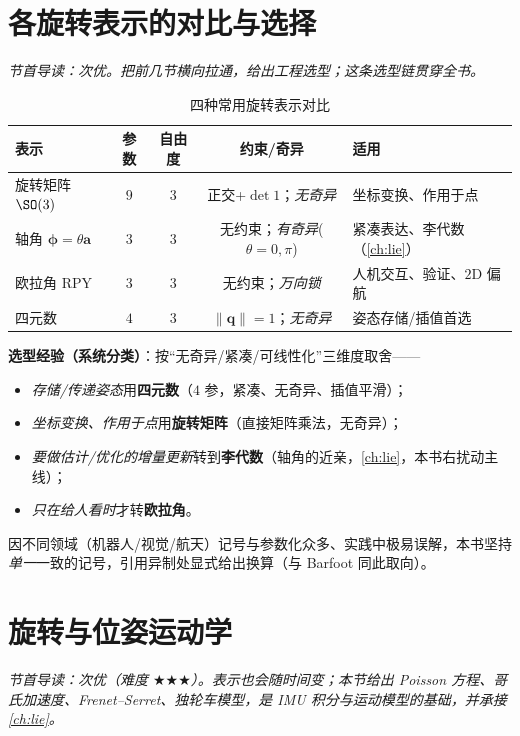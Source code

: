 \section{各旋转表示的对比与选择}
\label{sec:rb-compare}
\noindent\emph{节首导读：次优。把前几节横向拉通，给出工程选型；这条选型链贯穿全书。}

\begin{table}[H]\centering\small
\caption{四种常用旋转表示对比}
\label{tab:rb-compare}
\begin{tabular}{lcccl}
\toprule
表示 & 参数 & 自由度 & 约束/奇异 & 适用 \\
\midrule
旋转矩阵 $\SO(3)$ & $9$ & $3$ & 正交+$\det1$；\emph{无奇异} & 坐标变换、作用于点 \\
轴角 $\boldsymbol{\phi}=\theta\mathbf{a}$ & $3$ & $3$ & 无约束；\emph{有奇异}($\theta=0,\pi$) & 紧凑表达、李代数（\cref{ch:lie}）\\
欧拉角 RPY & $3$ & $3$ & 无约束；\emph{万向锁} & 人机交互、验证、$2$D 偏航 \\
四元数 & $4$ & $3$ & $\|\mathbf{q}\|=1$；\emph{无奇异} & 姿态存储/插值首选 \\
\bottomrule
\end{tabular}
\end{table}

\noindent\textbf{选型经验（系统分类）}：按“无奇异/紧凑/可线性化”三维度取舍——
\begin{itemize}
  \item \emph{存储/传递姿态}用\textbf{四元数}（$4$ 参，紧凑、无奇异、插值平滑）；
  \item \emph{坐标变换、作用于点}用\textbf{旋转矩阵}（直接矩阵乘法，无奇异）；
  \item \emph{要做估计/优化的增量更新}转到\textbf{李代数}（轴角的近亲，\cref{ch:lie}，本书右扰动主线）；
  \item \emph{只在给人看时}才转\textbf{欧拉角}。
\end{itemize}
因不同领域（机器人/视觉/航天）记号与参数化众多、实践中极易误解，本书坚持\emph{单一}一致的记号，引用异制处显式给出换算（与 Barfoot 同此取向\cite{barfoot2024state}）。

\section{旋转与位姿运动学}
\label{sec:rb-kinematics}
\noindent\emph{节首导读：次优（难度 $\bigstar\bigstar\bigstar$）。表示也会随时间变；本节给出 Poisson 方程、哥氏加速度、Frenet--Serret、独轮车模型，是 IMU 积分与运动模型的基础，并承接 \cref{ch:lie}。}

